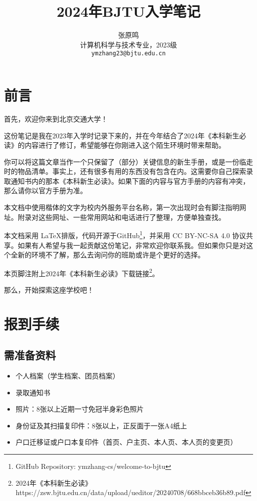\documentclass[a4paper]{ctexart}
\title{2024年BJTU入学笔记}
\author{张原鸣 \\ 计算机科学与技术专业，2023级 \\ \texttt{ymzhang23@bjtu.edu.cn}}
\begin{document}
\maketitle

\section{前言}

首先，欢迎你来到北京交通大学！

这份笔记是我在2023年入学时记录下来的，并在今年结合了2024年《本科新生必读》的内容进行了修订，希望能够在你刚进入这个陌生环境时带来帮助。

你可以将这篇文章当作一个只保留了（部分）关键信息的新生手册，或是一份临走时的物品清单。事实上，还有很多有用的东西没有包含在内。这需要你自己探索录取通知书内的那本《本科新生必读》。如果下面的内容与官方手册的内容有冲突，那么请你以官方手册为准。

本文档中使用楷体的文字为校内外服务平台名称，第一次出现时会有脚注指明网址。附录对这些网址、一些常用网站和电话进行了整理，方便单独查找。

本文档采用 \LaTeX 排版，代码开源于GitHub\footnote{GitHub Repository: ymzhang-cs/welcome-to-bjtu}，并采用 CC BY-NC-SA 4.0 协议共享。如果有人希望与我一起贡献这份笔记，非常欢迎你联系我。但如果你只是对这个全新的环境不了解，那么去询问你的班助或许是个更好的选择。

本页脚注附上2024年《本科新生必读》下载链接\footnote{2024年《本科新生必读》 https://zsw.bjtu.edu.cn/data/upload/ueditor/20240708/668bbceb36b89.pdf}。

那么，开始探索这座学校吧！

\newpage

\section{报到手续}

\subsection{需准备资料}
\begin{itemize}
	\item 个人档案（学生档案、团员档案）
	\item 录取通知书
	\item 照片：8张以上近期一寸免冠半身彩色照片
	\item 身份证及其扫描复印件：8张以上，正反面于一张A4纸上
	\item 户口迁移证或户口本复印件（首页、户主页、本人页、本人页的变更页）
\end{itemize}
\end{document}
